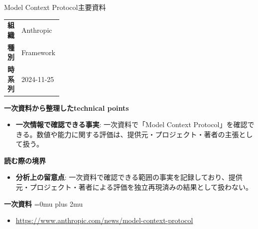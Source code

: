 \begin{technicalnote}{Model Context Protocol}{主要資料}
\begingroup
\begin{tabularx}{\linewidth}{@{}>{\bfseries}p{0.22\linewidth}X@{}}
組織 & Anthropic \\
種別 & Framework \\
時系列 & 2024-11-25 \\
\end{tabularx}
\smallskip
{\bfseries 一次資料から整理したtechnical points}
\begin{itemize}[leftmargin=1.5em,itemsep=0.35em]
\item \textbf{一次情報で確認できる事実}: 一次資料で「Model Context Protocol」を確認できる。数値や能力に関する評価は、提供元・プロジェクト・著者の主張として扱う。
\end{itemize}
\begin{minipage}{\linewidth}
{\bfseries 読む際の境界}
\begin{itemize}[leftmargin=1.5em,itemsep=0.35em]
\item \textbf{分析上の留意点}: 一次資料で確認できる範囲の事実を記録しており、提供元・プロジェクト・著者による評価を独立再現済みの結果として扱わない。
\end{itemize}
\begin{samepage}
{\bfseries 一次資料}
\begingroup\sloppy
\Urlmuskip=0mu plus 2mu\relax
\begin{itemize}[leftmargin=1.5em,itemsep=0.25em]
\item {\scriptsize\url{https://www.anthropic.com/news/model-context-protocol}}
\end{itemize}
\endgroup
\end{samepage}
\end{minipage}
\endgroup
\end{technicalnote}
\medskip

